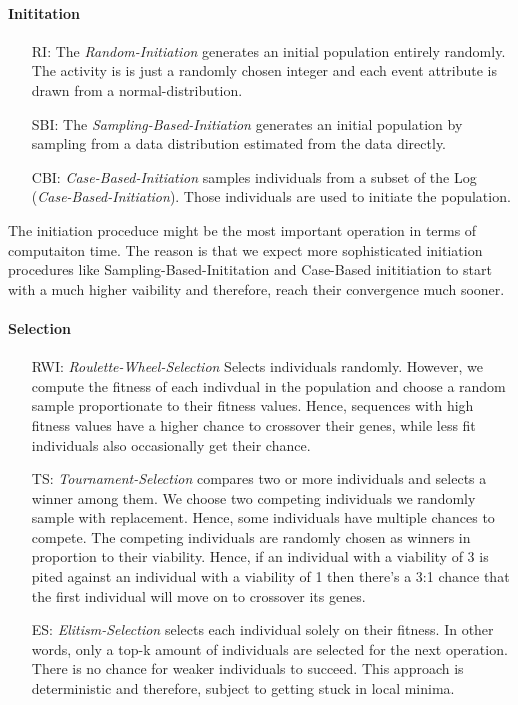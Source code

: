 \documentclass[./../../paper.tex]{subfiles}
\begin{document}
\paragraph{Inititation}
\begin{enumerate}
    \item[RI:] The \emph{Random-Initiation} generates an initial population entirely randomly. The activity is is just a randomly chosen integer and each event attribute is drawn from a normal-distribution.
    \item[SBI:] The \emph{Sampling-Based-Initiation} generates an initial population by sampling from a data distribution estimated from the data directly.
    \item[CBI:] \emph{Case-Based-Initiation} samples individuals from a subset of the Log (\emph{Case-Based-Initiation}). Those individuals are used to initiate the population.
\end{enumerate}
The initiation proceduce might be the most important operation in terms of computaiton time. The reason is that we expect more sophisticated initiation procedures like Sampling-Based-Inititation and Case-Based inititiation to start with a much higher vaibility and therefore, reach their convergence much sooner.


\paragraph{Selection}
\begin{enumerate}
    \item[RWI:] \emph{Roulette-Wheel-Selection} Selects individuals randomly. However, we compute the fitness of each indivdual in the population and choose a random sample proportionate to their fitness values. Hence, sequences with high fitness values have a higher chance to crossover their genes, while less fit individuals also occasionally get their chance.
    \item[TS:] \emph{Tournament-Selection} compares two or more individuals and selects a winner among them. We choose two competing individuals we randomly sample with replacement. Hence, some individuals have multiple chances to compete. The competing individuals are randomly chosen as winners in proportion to their viability. Hence, if an individual with a viability of 3 is pited against an individual with a viability of 1 then there's a 3:1 chance that the first individual will move on to crossover its genes.
    \item[ES:] \emph{Elitism-Selection} selects each individual solely on their fitness. In other words, only a top-k amount of individuals are selected for the next operation. There is no chance for weaker individuals to succeed. This approach is deterministic and therefore, subject to getting stuck in local minima.
\end{enumerate}
\end{document}
